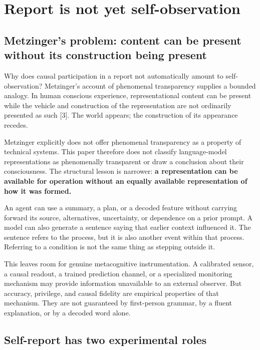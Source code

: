 \documentclass[12pt]{article}
\begin{document}
\section{Report is not yet self-observation}\label{report-is-not-yet-self-observation}

\subsection{Metzinger's problem: content can be present without its construction being present}\label{metzingers-problem-content-can-be-present-without-its-construction-being-present}

Why does causal participation in a report not automatically amount to self-observation? Metzinger's account of phenomenal transparency supplies a bounded analogy. In human conscious experience, representational content can be present while the vehicle and construction of the representation are not ordinarily presented as such {[}3{]}. The world appears; the construction of its appearance recedes.

Metzinger explicitly does not offer phenomenal transparency as a property of technical systems. This paper therefore does not classify language-model representations as phenomenally transparent or draw a conclusion about their consciousness. The structural lesson is narrower: \textbf{a representation can be available for operation without an equally available representation of how it was formed.}

An agent can use a summary, a plan, or a decoded feature without carrying forward its source, alternatives, uncertainty, or dependence on a prior prompt. A model can also generate a sentence saying that earlier context influenced it. The sentence refers to the process, but it is also another event within that process. Referring to a condition is not the same thing as stepping outside it.

This leaves room for genuine metacognitive instrumentation. A calibrated sensor, a causal readout, a trained prediction channel, or a specialized monitoring mechanism may provide information unavailable to an external observer. But accuracy, privilege, and causal fidelity are empirical properties of that mechanism. They are not guaranteed by first-person grammar, by a fluent explanation, or by a decoded word alone.

\subsection{Self-report has two experimental roles}\label{self-report-has-two-experimental-roles}
\end{document}
